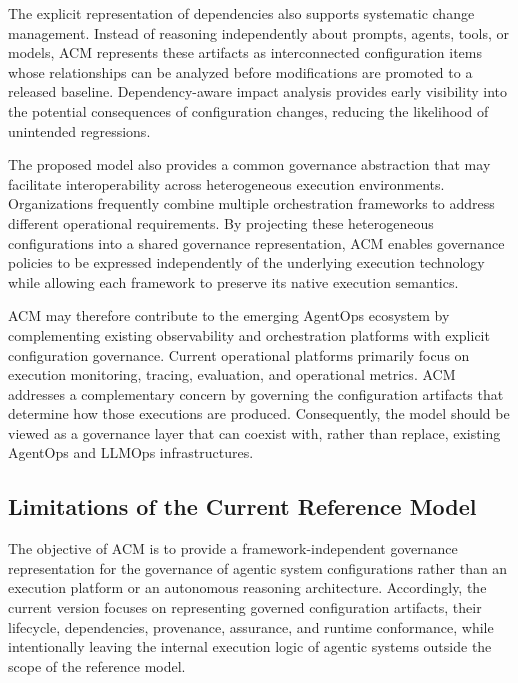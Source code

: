 \documentclass[10pt]{article}
\begin{document}
The explicit representation of dependencies also supports systematic change management. Instead of reasoning independently about prompts, agents, tools, or models, ACM represents these artifacts as interconnected configuration items whose relationships can be analyzed before modifications are promoted to a released baseline. Dependency-aware impact analysis provides early visibility into the potential consequences of configuration changes, reducing the likelihood of unintended regressions.

The proposed model also provides a common governance abstraction that may facilitate interoperability across heterogeneous execution environments. Organizations frequently combine multiple orchestration frameworks to address different operational requirements. By projecting these heterogeneous configurations into a shared governance representation, ACM enables governance policies to be expressed independently of the underlying execution technology while allowing each framework to preserve its native execution semantics.

ACM may therefore contribute to the emerging AgentOps ecosystem by complementing existing observability and orchestration platforms with explicit configuration governance. Current operational platforms primarily focus on execution monitoring, tracing, evaluation, and operational metrics. ACM addresses a complementary concern by governing the configuration artifacts that determine how those executions are produced. Consequently, the model should be viewed as a governance layer that can coexist with, rather than replace, existing AgentOps and LLMOps infrastructures.

\subsection{Limitations of the Current Reference Model}
\label{subsec:limitations}

The objective of ACM is to provide a framework-independent governance representation for the governance of agentic system configurations rather than an execution platform or an autonomous reasoning architecture. Accordingly, the current version focuses on representing governed configuration artifacts, their lifecycle, dependencies, provenance, assurance, and runtime conformance, while intentionally leaving the internal execution logic of agentic systems outside the scope of the reference model.
\end{document}
